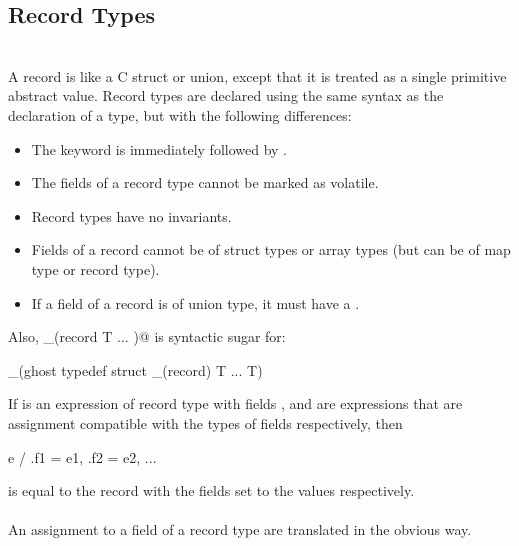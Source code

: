 \documentclass[preprint,nocopyrightspace]{sigplanconf}
\begin{document}
{{\subsection{Record Types}
\\
A record is like a C struct or union, except that it is treated as a
single primitive abstract value.  Record types are declared using the same syntax as
the declaration of a  type, but with the following
differences:
\begin{itemize}
\item The keyword  is immediately followed by
 .
\item The fields of a record type cannot be marked as volatile.
\item Record types have no invariants.
\item Fields of a record cannot be of struct types or array types (but
can be of map type or record type). 
\item If a field of a record is of union type, it must have
a .
\end{itemize}
Also, \vcc@_(record T { ... })@ is syntactic sugar for:
\begin{VCC}
_(ghost typedef struct _(record) T { ... } T)
\end{VCC}

If  is an expression of record type with
fields , and  are expressions that are
assignment compatible with the types of fields 
respectively, then
\begin{VCC}
  e / { .f1 = e1, .f2 = e2, ...}
\end{VCC}
is equal to the record  with the fields  set
to the values  respectively.
\\\\
An assignment to a field of a record type are translated in the
obvious way.

}}
\end{document}
